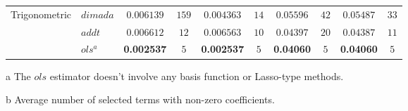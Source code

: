\begin{table}[!htbp]
{\begin{threeparttable}
\begin{tabular}{llcccccccc}
            Trigonometric & $dimada$  & $0.006139$ & $159$ & $0.004363$ & $14$ & $0.05596$ & $42$ & $0.05487$ & $33$ \\
            & $addt$ & $0.006612$ & $12$ & $0.006563$ & $10$ & $0.04397$ & $20$ & $0.04387$ & $11$ \\
            & $ols^a$ & \textbf{0.002537} & $5$ & \textbf{0.002537} & $5$ & \textbf{0.04060} & $5$ & \textbf{0.04060} & $5$ \\
            \hline 
            \hline
        \end{tabular}
        \begin{tablenotes}
            \item [a] The $ols$ estimator doesn't involve any basis function or Lasso-type methods.
            \item [b] Average number of selected terms with non-zero coefficients.
        \end{tablenotes}
        \end{threeparttable}
        }
    \end{table} 

